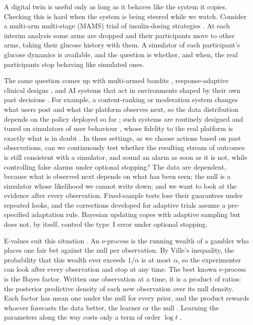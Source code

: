 \documentclass[pdflatex,sn-mathphys-ay]{sn-jnl}
\theoremstyle{thmstyleone}
\theoremstyle{thmstyletwo}
\begin{document}
A digital twin is useful only as long as it behaves like the system it
copies. Checking this is hard when the system is being steered while we
watch. Consider a multi-arm multi-stage (MAMS) trial of insulin-dosing
strategies \citep{whitehead1997design,magirr2012generalized}. At each interim
analysis some arms are dropped and their participants move to other arms,
taking their glucose history with them. A simulator of each participant's
glucose dynamics is available, and the question is whether, and when, the
real participants stop behaving like simulated ones.

The same question comes up with multi-armed bandits
\citep{lattimore2020bandit}, response-adaptive clinical designs
\citep{trippa2012bayesian,villar2015multi}, and AI systems that act in
environments shaped by their own past decisions
\citep{perdomo2020performative,dulacarnold2021challenges}. For example, a
content-ranking or moderation system changes what users post and what the
platform observes next, so the data distribution depends on the policy
deployed so far \citep{chaney2018algorithmic,jiang2019degenerate}; such
systems are routinely designed and tuned on simulators of user behaviour
\citep{ie2019recsim,shi2019virtual}, whose fidelity to the real platform is
exactly what is in doubt \citep{zhao2020sim}. In these settings, as we choose
actions based on past observations, can we continuously test whether the
resulting stream of outcomes is still consistent with a simulator, and sound
an alarm as soon as it is not, while controlling false alarms under optional
stopping? The data are dependent, because what is observed next depends on
what has been seen; the null is a simulator whose likelihood we
cannot write down; and we want to look at the evidence after
every observation. Fixed-sample tests lose
their guarantees under repeated looks, and the corrections developed for
adaptive trials \citep{bowden2017unbiased,magirr2012generalized} assume a
pre-specified adaptation rule. Bayesian updating copes with adaptive sampling
but does not, by itself, control the type~I error under optional stopping.

E-values suit this situation
\citep{vovk2021evalues,ramdas2023game,grunwald2024safe}. An e-process is the
running wealth of a gambler who places one fair bet against the null per
observation. By Ville's inequality, the probability that this wealth ever
exceeds $1/\alpha$ is at most $\alpha$, so the experimenter can look after
every observation and stop at any time. The best known e-process is the Bayes
factor. Written one observation at a time, it is a product of ratios: the
posterior predictive density of each new observation over its null density.
Each factor has mean one under the null for every prior, and the product
rewards whoever forecasts the data better, the learner or the null
\citep{dawid1984present}. Learning the parameters along the way costs only a
term of order $\log t$ \citep{clarke1990information}.
\end{document}
